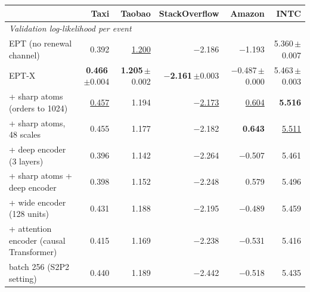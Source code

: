 \begin{tabular}{lrrrrr}
\toprule
& Taxi & Taobao & StackOverflow & Amazon & INTC \\
\midrule
\multicolumn{6}{l}{\textit{Validation log-likelihood per event}} \\[1pt]
\quad EPT (no renewal channel) & 0.392 & \underline{1.200} & $-$2.186 & $-$1.193 & 5.360{\scriptsize\,$\pm$0.007} \\
\quad EPT-X & \textbf{0.466}{\scriptsize\,$\pm$0.004} & \textbf{1.205}{\scriptsize\,$\pm$0.002} & \textbf{$-$2.161}{\scriptsize\,$\pm$0.003} & $-$0.487{\scriptsize\,$\pm$0.000} & 5.463{\scriptsize\,$\pm$0.003} \\
\quad \quad + sharp atoms (orders to 1024) & \underline{0.457} & 1.194 & \underline{$-$2.173} & \underline{0.604} & \textbf{5.516} \\
\quad \quad + sharp atoms, 48 scales & 0.455 & 1.177 & $-$2.182 & \textbf{0.643} & \underline{5.511} \\
\quad \quad + deep encoder (3 layers) & 0.396 & 1.142 & $-$2.264 & $-$0.507 & 5.461 \\
\quad \quad + sharp atoms + deep encoder & 0.398 & 1.152 & $-$2.248 & 0.579 & 5.496 \\
\quad \quad + wide encoder (128 units) & 0.431 & 1.188 & $-$2.195 & $-$0.489 & 5.459 \\
\quad \quad + attention encoder (causal Transformer) & 0.415 & 1.169 & $-$2.238 & $-$0.531 & 5.416 \\
\quad \quad batch 256 (S2P2 setting) & 0.440 & 1.189 & $-$2.442 & $-$0.518 & 5.435 \\
\bottomrule
\end{tabular}